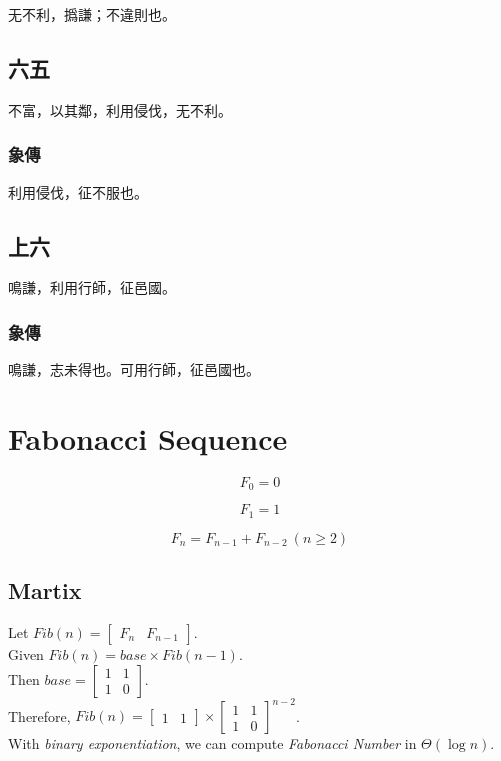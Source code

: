\documentclass[12pt, a4paper]{article}
\begin{document}
无不利，撝謙；不違則也。

\subsection{六五}

不富，以其鄰，利用侵伐，无不利。

\subsubsection{象傳}

利用侵伐，征不服也。

\subsection{上六}

鳴謙，利用行師，征邑國。

\subsubsection{象傳}

鳴謙，志未得也。可用行師，征邑國也。

\section{Fabonacci Sequence}

\[
	F_0 = 0
\]

\[
	F_1 = 1
\]

\[
	F_n = F_{n-1} + F_{n-2}\ (n \geq 2)
\]

\subsection{Martix}

Let $Fib(n) = \begin{bmatrix} F_n & F_{n-1}\end{bmatrix}$.\\[1cm]
Given $Fib(n) = base \times Fib(n-1)$.\\[1em]
Then $base = \begin{bmatrix} 1 & 1 \\ 1 & 0\end{bmatrix}$.\\
Therefore, $Fib(n) = \begin{bmatrix} 1 & 1\end{bmatrix} \times \begin{bmatrix} 1 & 1 \\ 1 & 0\end{bmatrix}^{n-2}$.\\[10pt]
With \textsl{binary exponentiation}, we can compute \textit{Fabonacci Number} in $\Theta(\log n)$.
\end{document}

